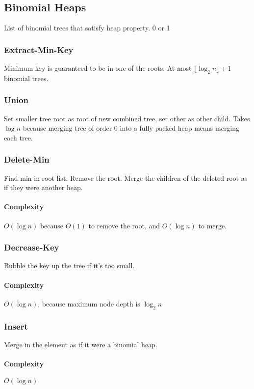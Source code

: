 \documentclass[a4paper]{article}
\begin{document}
\subsection{Binomial Heaps}
List of binomial trees that satisfy heap property. 0 or 1 

\subsubsection{Extract-Min-Key}
Minimum key is guaranteed to be in one of the roots. At most $\lfloor{\log_2n}\rfloor + 1$ binomial trees.

\subsubsection{Union}
Set smaller tree root as root of new combined tree, set other as other child. Takes $\log n$ because merging tree of order 0 into a fully packed heap means merging each tree.

\subsubsection{Delete-Min}
Find min in root list. Remove the root. Merge the children of the deleted root as if they were another heap.

\paragraph{Complexity}
$O(\log n)$ because $O(1)$ to remove the root, and $O(\log n)$ to merge.

\subsubsection{Decrease-Key}
Bubble the key up the tree if it's too small.

\paragraph{Complexity}
$O(\log n)$, because maximum node depth is $\log_2 n$

\subsubsection{Insert}
Merge in the element as if it were a binomial heap.

\paragraph{Complexity}
$O(\log n)$
\end{document}
